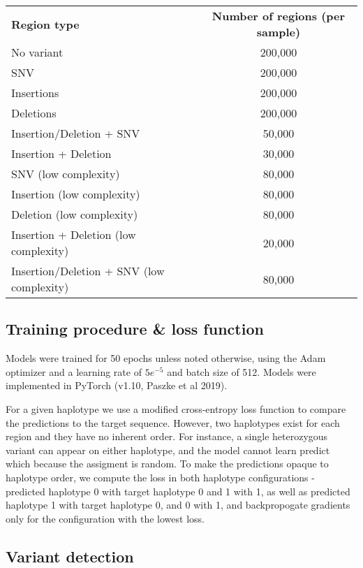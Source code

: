 \documentclass[]{article}
\begin{document}
\begin{center}
	\begin{tabular}{ lc }
	 \textbf{Region type} & \textbf{Number of regions (per sample)} \\
	 No variant & 200,000 \\
	 SNV & 200,000 \\
	 Insertions & 200,000 \\
	 Deletions & 200,000 \\
	 Insertion/Deletion + SNV & 50,000 \\
	 Insertion + Deletion & 30,000 \\
	 SNV (low complexity) & 80,000 \\
	 Insertion (low complexity) & 80,000 \\
	 Deletion (low complexity) & 80,000 \\  
	 Insertion + Deletion (low complexity) & 20,000 \\
	 Insertion/Deletion + SNV (low complexity) & 80,000 \\
	\end{tabular}
	\label{table:regioncounts}
\end{center}

\subsection{Training procedure \& loss function}

Models were trained for 50 epochs unless noted otherwise, using the Adam optimizer and a learning rate of $5e^{-5}$ and batch size of 512. Models were implemented in PyTorch (v1.10, Paszke et al 2019).

For a given haplotype we use a modified cross-entropy loss function to compare the predictions to the target sequence. However, two haplotypes exist for each region and they have no inherent order. For instance, a single heterozygous variant can appear on either haplotype, and the model cannot learn predict which because the assigment is random. To make the predictions opaque to haplotype order, we compute the loss in both haplotype configurations - predicted haplotype 0 with target haplotype 0 and 1 with 1, as well as predicted haplotype 1 with target haplotype 0, and 0 with 1, and backpropogate gradients only for the configuration with the lowest loss. 



\subsection{Variant detection}
\end{document}
